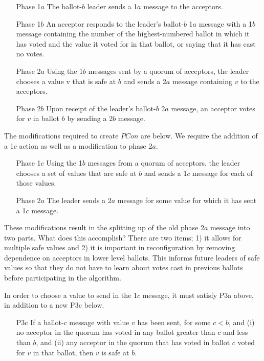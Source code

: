 \documentclass[conference]{IEEEtran}
\begin{document}
\begin{enumerate}[leftmargin=5em]
\item[Phase 1$a$] The ballot-$b$ leader sends a 1$a$ message to the acceptors.
\item[Phase 1$b$] An acceptor responds to the leader’s ballot-$b$ 1$a$ message with a 1$b$ message containing the number of the highest-numbered ballot in which it has voted and the value it voted for in that ballot, or saying that it has cast no votes.
\end{enumerate}
\smallskip

\begin{enumerate}[leftmargin=5em]
\item[Phase 2$a$] Using the 1$b$ messages sent by a quorum of acceptors, the leader chooses a value v that is safe at $b$ and sends a 2$a$ message containing $v$ to the acceptors.
\item[Phase 2$b$] Upon receipt of the leader’s ballot-$b$ 2$a$ message, an acceptor votes for $v$ in ballot $b$ by sending a 2$b$ message.
\end{enumerate}
\smallskip
The modifications required to create $PCon$ are below. We require the addition of a 1$c$ action as well as a modification to phase 2$a$.
\smallskip

\begin{enumerate}[leftmargin=5em]
\item[Phase 1$c$] Using the 1$b$ messages from a quorum of acceptors, the leader chooses a set of values that are safe at $b$ and sends a 1$c$ message for each of those values.
\item[Phase 2$a$] The leader sends a 2$a$ message for some value for which it has sent a 1$c$ message.
\end{enumerate}
\smallskip

These modifications result in the splitting up of the old phase 2$a$ message into two parts. What does this accomplish? There are two items; 1) it allows for multiple safe values and 2) it is important in reconfiguration by removing dependence on acceptors in lower level ballots. This informs future leaders of safe values so that they do not have to learn about votes cast in previous ballots before participating in the algorithm.

In order to choose a value to send in the 1$c$ message, it must satisfy P3a above, in addition to a new P3c below.
\smallskip
\begin{enumerate}[leftmargin=4em]
\item[P3c] If a ballot-$c$ message with value $v$ has been sent, for some $c < b$, and (i) no acceptor in the quorum has voted in any ballot greater than $c$ and less than $b$, and (ii) any acceptor in the quorum that has voted in ballot $c$ voted for $v$ in that ballot, then $v$ is safe at $b$.
\end{enumerate}
\smallskip
\end{document}
